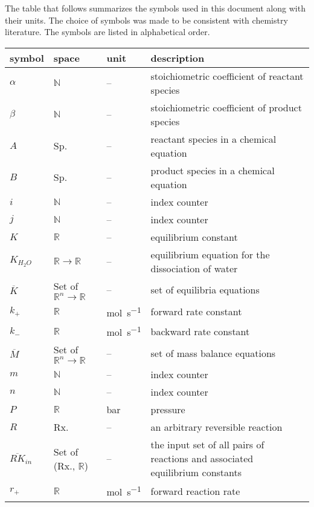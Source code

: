 \documentclass[12pt]{article}
\begin{document}
The table that follows summarizes the symbols used in this document along with
their units.  The choice of symbols was made to be consistent with chemistry 
literature.  The symbols are listed in alphabetical order.
~\newline
\renewcommand{\arraystretch}{1.2}
\noindent \begin{longtable*}{l l l p{8cm}} \toprule
\textbf{symbol} & \textbf{space} & \textbf{unit} & \textbf{description}\\
\midrule 
$\alpha$ & $\mathbb{N}$ & -- & stoichiometric coefficient of reactant species
\\
$\beta$ & $\mathbb{N}$ & -- & stoichiometric coefficient of product species
\\$A$ & Sp. & -- & reactant species in a chemical equation
\\
$B$ & Sp. & -- & product species in a chemical equation
\\ 
$i$ & $\mathbb{N}$ & -- & index counter
\\ 
$j$ & $\mathbb{N}$ & -- & index counter
\\
$K$ & $\mathbb{R}$ & -- & equilibrium constant
\\
$K_{H_2O}$ & $\mathbb{R} \rightarrow \mathbb{R}$ & -- & equilibrium equation for the dissociation of water
\\
$\overline K$ & Set of $\mathbb{R}^n \rightarrow \mathbb{R}$ & -- & set of equilibria equations 
\\
$k_+$ & $\mathbb{R}$ & \si{\mole\per\second} & forward rate constant
\\
$k_-$ & $\mathbb{R}$ & \si{\mole\per\second} & backward rate constant
\\
$\overline M$ & Set of $\mathbb{R}^n \rightarrow \mathbb{R}$ & -- &  set of mass balance equations
\\ 
$m$ & $\mathbb{N}$ & -- & index counter
\\ 
$n$ & $\mathbb{N}$ & -- & index counter
\\
$P$ & $\mathbb{R}$ & \si{\bar} & pressure
\\
$R$ & Rx. & -- & an arbitrary reversible reaction
\\ 
$\overline {RK}_{in}$ & Set of (Rx., $\mathbb{R}$) & -- & the input set of all pairs of reactions and 
  associated equilibrium constants 
\\ 
$r_+$ & $\mathbb{R}$ & \si{\mole\per\second} & forward reaction rate
\\

\end{longtable*}
\end{document}
